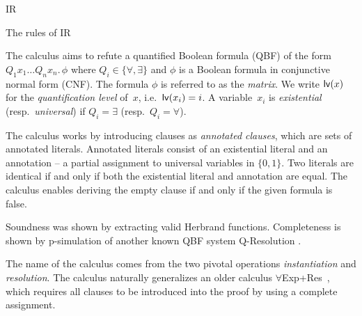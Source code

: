 \begin{entry}{IR}
\begin{calculus}
    \centerline{The rules of IR~\cite{MFCS14}}
\end{calculus}


\begin{clarifications}
  The calculus aims to refute a quantified Boolean formula (QBF) of the form
  $Q_1 x_1\dots Q_n x_n.\,\phi$ where $Q_i\in\{\forall,\exists\}$
  and $\phi$ is a Boolean formula in conjunctive normal form (CNF).
  The formula $\phi$ is referred to as the \emph{matrix}.
  We write ${\sf lv}(x)$ for the \emph{quantification level} of~$x$, i.e.\ ${\sf lv}(x_i)=i$.
  A variable~$x_i$ is \emph{existential} (resp.\ \emph{universal}) if $Q_i=\exists$ (resp.\ $Q_i=\forall$).

  The calculus works by introducing clauses as \emph{annotated clauses}, which are sets of annotated literals. Annotated literals consist of an existential literal and an annotation -- a partial assignment to universal variables in $\{0,1\}$. Two literals are identical if and only if both the existential literal and annotation are equal.
%
  The calculus enables deriving the empty clause if and only if the given formula is false.
\end{clarifications}


\begin{technicalities}
Soundness was shown by extracting valid Herbrand functions. Completeness is shown by p-simulation of 
another known QBF system Q-Resolution .
\end{technicalities}




\begin{history}
The name of the calculus comes from the two pivotal operations \emph{instantiation} and \emph{resolution}.
The calculus naturally generalizes an older calculus $\forall$Exp+Res~\cite{JanotaTCS15},
which  requires all clauses to be introduced into the proof by using a complete assignment.
\end{history}


\end{entry}
